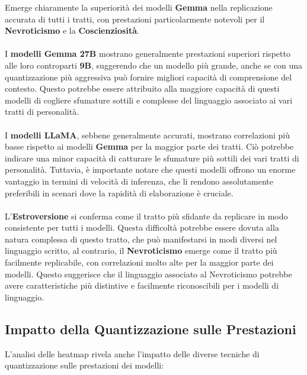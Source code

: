 Emerge chiaramente la superiorità dei modelli \textbf{Gemma} nella replicazione accurata di tutti i tratti, con prestazioni particolarmente notevoli per il \textbf{Nevroticismo} e la \textbf{Coscienziosità}.\\\\
I \textbf{modelli Gemma 27B} mostrano generalmente prestazioni superiori rispetto alle loro controparti \textbf{9B}, suggerendo che un modello più grande, anche se con una quantizzazione più aggressiva può fornire migliori capacità di comprensione del contesto.
Questo potrebbe essere attribuito alla maggiore capacità di questi modelli di cogliere sfumature sottili e complesse del linguaggio associato ai vari tratti di personalità.\\\\
I \textbf{modelli LLaMA}, sebbene generalmente accurati, mostrano correlazioni più basse rispetto ai modelli \textbf{Gemma} per la maggior parte dei tratti.
Ciò potrebbe indicare una minor capacità di catturare le sfumature più sottili dei vari tratti di personalità.
Tuttavia, è importante notare che questi modelli offrono un enorme vantaggio in termini di velocità di inferenza, che li rendono assolutamente preferibili in scenari dove la rapidità di elaborazione è cruciale.\\\\
L'\textbf{Estroversione} si conferma come il tratto più sfidante da replicare in modo consistente per tutti i modelli.
Questa difficoltà potrebbe essere dovuta alla natura complessa di questo tratto, che può manifestarsi in modi diversi nel linguaggio scritto, al contrario, il \textbf{Nevroticismo} emerge come il tratto più facilmente replicabile, con correlazioni molto alte per la maggior parte dei modelli. Questo suggerisce che il linguaggio associato al Nevroticismo potrebbe avere caratteristiche più distintive e facilmente riconoscibili per i modelli di linguaggio.

\subsection{Impatto della Quantizzazione sulle Prestazioni}

L'analisi delle heatmap rivela anche l'impatto delle diverse tecniche di quantizzazione sulle prestazioni dei modelli:

